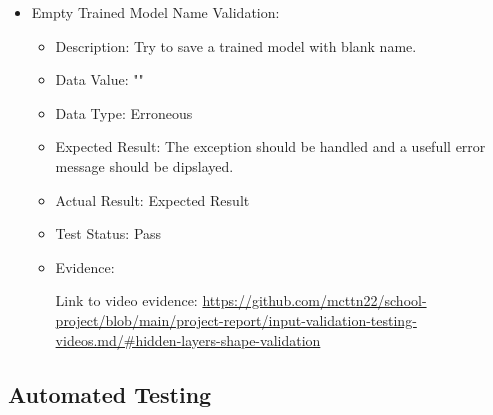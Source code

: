 \documentclass[./project-report/src/latex/project-report.tex]{subfiles}
\begin{document}
\begin{itemize}
\begin{itemize}
        \item Empty Trained Model Name Validation:
            \begin{itemize}
                \item Description: Try to save a trained model with blank name.
                \item Data Value: ""
                \item Data Type: Erroneous
                \item Expected Result: The exception should be handled and a usefull error message should be dipslayed.
                \item Actual Result: Expected Result
                \item Test Status: Pass
                \item Evidence:
                    \begin{figure}[h!]
                    \centering
                    \end{figure}

                    Link to video evidence: \url{https://github.com/mcttn22/school-project/blob/main/project-report/input-validation-testing-videos.md/#hidden-layers-shape-validation}
            \end{itemize}
    \end{itemize}
\end{itemize}

\subsection{Automated Testing}
\end{document}
